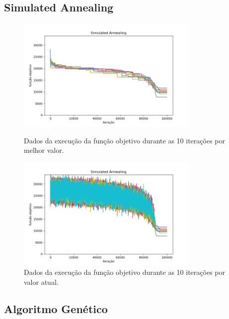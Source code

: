 \subsection{Simulated Annealing}

\begin{figure}[H]
\centering
  \begin{minipage}[b]{0.48\textwidth}
    \includegraphics[width=88mm]{imagens/otima/problema-3-simulated-annealing-funcao-objetivo-best.png}
    \caption{Dados da execução da função objetivo durante as 10 iterações por melhor valor.
    \label{fig:problema-3-simulated-annealing-funcao-objetivo-best}}
  \end{minipage}
  \hfill
  \begin{minipage}[b]{0.48\textwidth}
    \includegraphics[width=88mm]{imagens/otima/problema-3-simulated-annealing-funcao-objetivo-value.png}
    \caption{Dados da execução da função objetivo durante as 10 iterações por valor atual.
    \label{fig:problema-3-simulated-annealing-funcao-objetivo-value}}
  \end{minipage}
\end{figure}

\subsection{Algoritmo Genético}

